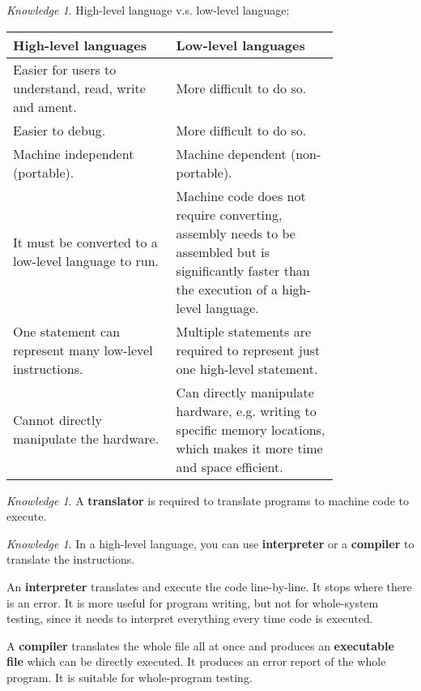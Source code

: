 \documentclass[8pt]{article}
\theoremstyle{remark}
\newtheorem{knowledge}[method]{Knowledge}
\begin{document}
            \begin{knowledge}
                High-level language v.s. low-level language:
                \begin{center}
                    \begin{tabular}{p{0.4\linewidth}|p{0.4\linewidth}}
                        High-level languages & Low-level languages\\\hline\hline
                        Easier for users to understand, read, write and ament. & More difficult to do so.\\\hline
                        Easier to debug. & More difficult to do so.\\\hline
                        Machine independent (portable). & Machine dependent (non-portable).\\\hline
                        It must be converted to a low-level language to run. & Machine code does not require converting, assembly needs to be assembled but is significantly faster than the execution of a high-level language.\\\hline
                        One statement can represent many low-level instructions. & Multiple statements are required to represent just one high-level statement.\\\hline
                        Cannot directly manipulate the hardware. & Can directly manipulate hardware, e.g. writing to specific memory locations, which makes it more time and space efficient.
                    \end{tabular}
                \end{center}
            \end{knowledge}

            \begin{knowledge}
                A \textbf{translator} is required to translate programs to machine code to execute.
            \end{knowledge}

            \begin{knowledge}
                In a high-level language, you can use \textbf{interpreter} or a \textbf{compiler} to translate the instructions.

                An \textbf{interpreter} translates and execute the code line-by-line. It stops where there is an error. It is more useful for program writing, but not for whole-system testing, since it needs to interpret everything every time code is executed.

                A \textbf{compiler} translates the whole file all at once and produces an \textbf{executable file} which can be directly executed. It produces an error report of the whole program. It is suitable for whole-program testing.
            \end{knowledge}
\end{document}
